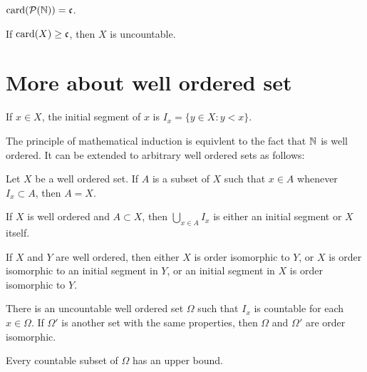 \begin{proposition}
    $\mathrm{card}(\mathcal{P}(\mathbb{N})) = \mathfrak{c}$.
\end{proposition}

\begin{corollary}
    If $\mathrm{card}(X) \ge \mathfrak{c}$, then $X$ is uncountable.
\end{corollary}

\section{More about well ordered set}

\begin{definition}
    If $x \in X$, the initial segment of $x$ is $I_x = \{ y \in X : y < x \}$.
\end{definition}

The principle of mathematical induction is equivlent to the fact that $\mathbb{N}$ is well ordered.
It can be extended to arbitrary well ordered sets as follows:

\begin{theorem}
    Let $X$ be a well ordered set. 
    If $A$ is a subset of $X$ such that $x \in A$ whenever $I_x \subset A$, then $A=X$.
\end{theorem}

\begin{proposition}
    If $X$ is well ordered and $A \subset X$, then $\bigcup_{x \in A} I_x$ is either an initial segment or $X$ itself. 
\end{proposition}

\begin{proposition}
    If $X$ and $Y$ are well ordered, then either $X$ is order isomorphic to $Y$, or $X$ is order isomorphic to an initial segment in $Y$, or an initial segment in $X$ is order isomorphic to $Y$.
\end{proposition}

\begin{proposition}
    There is an uncountable well ordered set $\Omega$ such that $I_x$ is countable for each $x \in \Omega$.
    If $\Omega'$ is another set with the same properties, then $\Omega$ and $\Omega'$ are order isomorphic.
\end{proposition}

\begin{proposition}
    Every countable subset of $\Omega$ has an upper bound.
\end{proposition}


